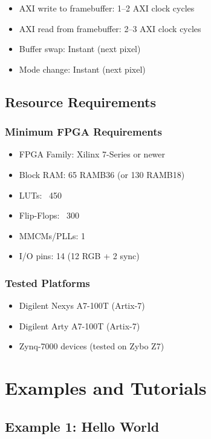 \documentclass[11pt,letterpaper]{report}
\begin{document}
\begin{itemize}
    \item AXI write to framebuffer: 1--2 AXI clock cycles
    \item AXI read from framebuffer: 2--3 AXI clock cycles
    \item Buffer swap: Instant (next pixel)
    \item Mode change: Instant (next pixel)
\end{itemize}

\section{Resource Requirements}

\subsection{Minimum FPGA Requirements}

\begin{itemize}
    \item FPGA Family: Xilinx 7-Series or newer
    \item Block RAM: 65 RAMB36 (or 130 RAMB18)
    \item LUTs: ~450
    \item Flip-Flops: ~300
    \item MMCMs/PLLs: 1
    \item I/O pins: 14 (12 RGB + 2 sync)
\end{itemize}

\subsection{Tested Platforms}

\begin{itemize}
    \item Digilent Nexys A7-100T (Artix-7)
    \item Digilent Arty A7-100T (Artix-7)
    \item Zynq-7000 devices (tested on Zybo Z7)
\end{itemize}

\chapter{Examples and Tutorials}

\section{Example 1: Hello World}
\end{document}
